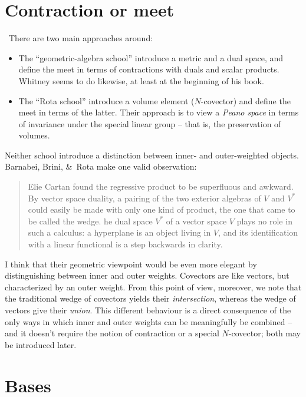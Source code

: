 \documentclass[\ifafour a4paper,12pt,\else a5paper,10pt,\fi%
onecolumn,oneside,article,%
british%
]{memoir}
\theoremstyle{remark}
\theoremstyle{innote}
\newcommand*{\amp}{\&}
\renewcommand*{\|}{\nonscript\,\vert\nonscript\;\mathopen{}}
\newcommand*{\puzzle}{{\fontencoding{U}\fontfamily{fontawesometwo}\selectfont\symbol{225}}}
\newcommand{\mynote}[1]{ {\color{notecolour}\puzzle\ #1}}
\newcommand*{\+}{\boxplus}
\newcommand*{\yN}{N}
\begin{document}
\section{Contraction or meet}
\label{sec:contraction}

\mynote{There are two main approaches around:
  \begin{itemize}
  \item The \enquote{geometric-algebra school} introduce a metric and a
    dual space, and define the meet in terms of contractions with duals and
    scalar products. Whitney seems to do likewise, at least at the
    beginning of his book.
  \item The \enquote{Rota school} introduce a volume element
    ($\yN$-covector) and define the meet in terms of the latter. Their
    approach is to view a \emph{Peano space} in terms of invariance under
    the special linear group -- that is, the preservation of volumes.
  \end{itemize}
  Neither school introduce a distinction between inner- and outer-weighted
  objects. Barnabei, Brini, \amp\ Rota make one valid observation:
  \begin{quote}\small
    Elie Cartan found the regressive product to be superfluous and awkward.
    By vector space duality, a pairing of the two exterior algebras of $V$
    and $V^*$ could easily be made with only one kind of product, the one
    that came to be called the wedge. \textelp{However, T}he dual space
    $V^*$ of a vector space $V$ plays no role in such a calculus: a
    hyperplane is an object living in $V$, and its identification with a
    linear functional is a step backwards in clarity.
  \end{quote}
  I think that their geometric viewpoint would be even more elegant by
  distinguishing between inner and outer weights. Covectors are like
  vectors, but characterized by an outer weight. From this point of view,
  moreover, we note that the traditional wedge of covectors yields their
  \emph{intersection}, whereas the wedge of vectors give their
  \emph{union}. This different behaviour is a direct consequence of the
  only ways in which inner and outer weights can be meaningfully be
  combined -- and it doesn't require the notion of contraction or a special
  $\yN$-covector; both may be introduced later. }



\section{Bases}
\label{sec:bases}
\end{document}
